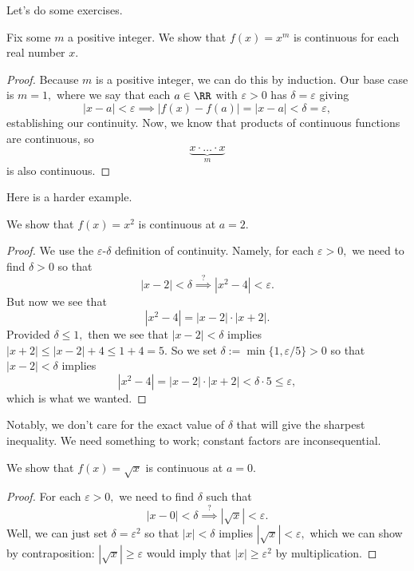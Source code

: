 Let's do some exercises.
\begin{exercise}[Ross 17.5]
	Fix some $m$ a positive integer. We show that $f(x)=x^m$ is continuous for each real number $x.$
\end{exercise}
\begin{proof}
	Because $m$ is a positive integer, we can do this by induction. Our base case is $m=1,$ where we say that each $a\in\RR$ with $\varepsilon>0$ has $\delta=\varepsilon$ giving
	\[|x-a|<\varepsilon\implies|f(x)-f(a)|=|x-a|<\delta=\varepsilon,\]
	establishing our continuity. Now, we know that products of continuous functions are continuous, so
	\[\underbrace{x\cdot\ldots\cdot x}_{m}\]
	is also continuous.
\end{proof}
Here is a harder example.
\begin{exercise}[Ross 17.9(a)]
	We show that $f(x)=x^2$ is continuous at $a=2.$
\end{exercise}
\begin{proof}
	We use the $\varepsilon$-$\delta$ definition of continuity. Namely, for each $\varepsilon>0,$ we need to find $\delta>0$ so that
	\[|x-2|<\delta\stackrel?\implies\left|x^2-4\right|<\varepsilon.\]
	But now we see that
	\[\left|x^2-4\right|=|x-2|\cdot|x+2|.\]
	Provided $\delta\le1,$ then we see that $|x-2|<\delta$ implies $|x+2|\le|x-2|+4\le1+4=5.$ So we set $\delta:=\min\{1,\varepsilon/5\}>0$ so that $|x-2|<\delta$ implies
	\[\left|x^2-4\right|=|x-2|\cdot|x+2|<\delta\cdot5\le\varepsilon,\]
	which is what we wanted.
\end{proof}
Notably, we don't care for the exact value of $\delta$ that will give the sharpest inequality. We need something to work; constant factors are inconsequential.
\begin{exercise}[Ross 17.9(b)]
	We show that $f(x)=\sqrt x$ is continuous at $a=0.$
\end{exercise}
\begin{proof}
	For each $\varepsilon>0,$ we need to find $\delta$ such that
	\[|x-0|<\delta\stackrel?\implies\left|\sqrt{x}\right|<\varepsilon.\]
	Well, we can just set $\delta=\varepsilon^2$ so that $|x|<\delta$ implies $|\sqrt x|<\varepsilon,$ which we can show by contraposition: $|\sqrt x|\ge\varepsilon$ would imply that $|x|\ge\varepsilon^2$ by multiplication.
\end{proof}


